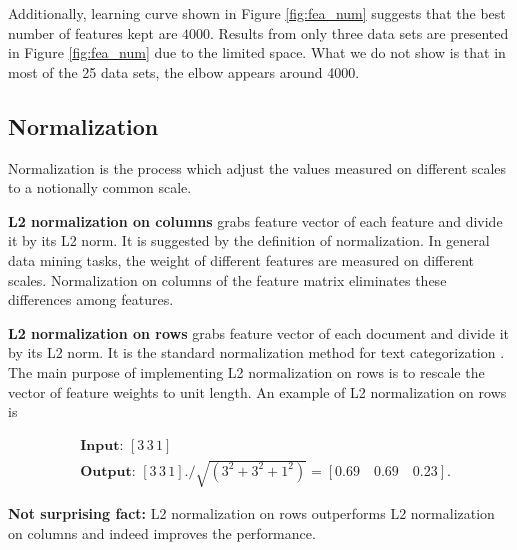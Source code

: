 \documentclass{sig-alternate-05-2015}
\begin{document}

Additionally, learning curve shown in Figure \ref{fig:fea_num} suggests that the best number of features kept are $4000$. Results from only three data sets are presented in Figure \ref{fig:fea_num} due to the limited space. What we do not show is that in most of the 25 data sets, the elbow appears around 4000.

\subsection{Normalization}

Normalization is the process which adjust the values measured on different scales to a notionally common scale.

\textbf{L2 normalization on columns} grabs feature vector of each feature and divide it by its L2 norm. It is suggested by the definition of normalization. In general data mining tasks, the weight of different features are measured on different scales. Normalization on columns of the feature matrix eliminates these differences among features.

\textbf{L2 normalization on rows} grabs feature vector of each document and divide it by its L2 norm. It is the standard normalization method for text categorization \cite{frank2006naive}. The main purpose of implementing L2 normalization on rows is to rescale the vector of feature weights to unit length. An example of L2 normalization on rows is

\begin{equation*}
\begin{aligned}
    &\textbf{Input: }[3 \, 3 \, 1]\\
    &\textbf{Output: }[3 \, 3 \, 1]./\sqrt{(3^2+3^2+1^2)}=[0.69 \quad 0.69 \quad 0.23].
\end{aligned}
\end{equation*}


\textbf{Not surprising fact:} L2 normalization on rows outperforms L2 normalization on columns and indeed improves the performance.
\end{document}
